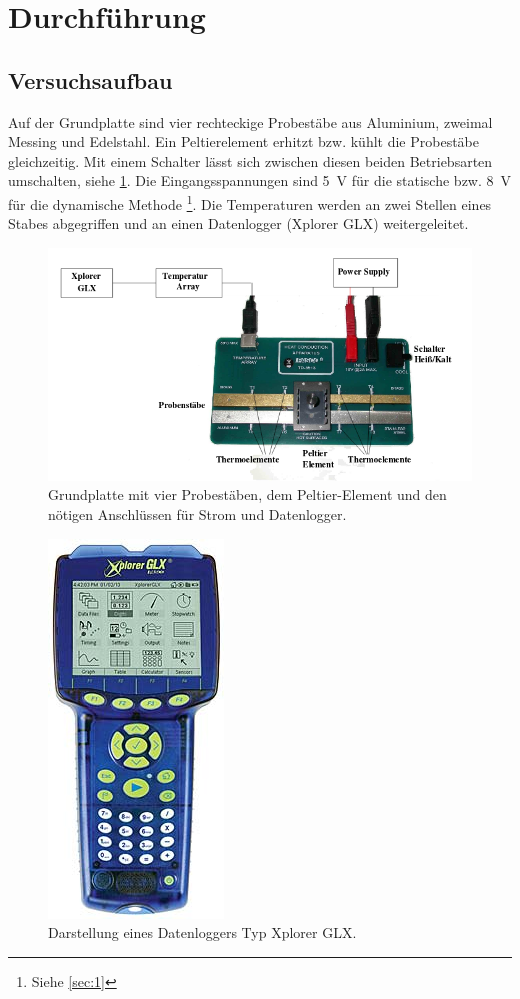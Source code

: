 \section{Durchführung}
\subsection{Versuchsaufbau}
Auf der Grundplatte sind vier rechteckige Probestäbe aus Aluminium, zweimal Messing
und Edelstahl. Ein Peltierelement erhitzt bzw. kühlt die Probestäbe gleichzeitig.
Mit einem Schalter lässt sich zwischen diesen beiden Betriebsarten umschalten, siehe \ref{fig:1}.
Die Eingangsspannungen sind \SI{5}{\volt} für die statische bzw. \SI{8}{\volt}
für die dynamische Methode \footnote{Siehe \ref{sec:1}}. Die Temperaturen werden
an zwei Stellen eines Stabes abgegriffen und an einen Datenlogger (Xplorer GLX)
weitergeleitet.
\begin{figure}[t]
  \centering
  \includegraphics[scale=0.5]{versuchsaufbau.png}
  \caption{Grundplatte mit vier Probestäben, dem Peltier-Element und den nötigen Anschlüssen
  für Strom und Datenlogger.}
  \label{fig:1}
\end{figure}
\begin{figure}
  \centering
  \includegraphics[scale=0.5]{xplorer_glx.jpg}
  \caption{Darstellung eines Datenloggers Typ Xplorer GLX.}
  \label{fig:2}
\end{figure}
